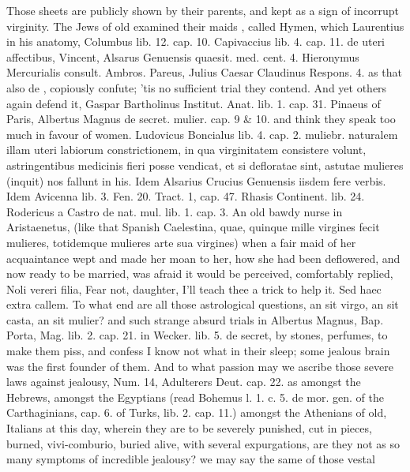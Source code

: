 Those sheets are publicly shown by their parents, and kept as a sign of
incorrupt virginity. The Jews of old examined their maids , called Hymen, which Laurentius in his anatomy, Columbus lib.
12. cap. 10. Capivaccius lib. 4. cap. 11. de uteri affectibus, Vincent,
Alsarus Genuensis quaesit. med. cent. 4. Hieronymus Mercurialis
consult. Ambros. Pareus, Julius Caesar Claudinus Respons. 4. as that
also de , copiously confute; 'tis
no sufficient trial they contend. And yet others again defend it,
Gaspar Bartholinus Institut. Anat. lib. 1. cap. 31. Pinaeus of Paris,
Albertus Magnus de secret. mulier. cap. 9 \& 10. \etc{} and think they
speak too much in favour of women.  Ludovicus Boncialus lib. 4.
cap. 2. muliebr. naturalem illam uteri labiorum constrictionem, in qua
virginitatem consistere volunt, astringentibus medicinis fieri posse
vendicat, et si defloratae sint, astutae mulieres (inquit) nos
fallunt in his. Idem Alsarius Crucius Genuensis iisdem fere verbis.
Idem Avicenna lib. 3. Fen. 20. Tract. 1, cap. 47. Rhasis
Continent. lib. 24. Rodericus a Castro de nat. mul. lib. 1. cap. 3. An
old bawdy nurse in Aristaenetus, (like that Spanish Caelestina,
quae, quinque mille virgines fecit mulieres, totidemque mulieres
arte sua virgines) when a fair maid of her acquaintance wept and made
her moan to her, how she had been deflowered, and now ready to be
married, was afraid it would be perceived, comfortably replied, Noli
vereri filia, \etc{} Fear not, daughter, I'll teach thee a trick to help
it. Sed haec extra callem. To what end are all those astrological
questions, an sit virgo, an sit casta, an sit mulier? and such strange
absurd trials in Albertus Magnus, Bap. Porta, Mag. lib. 2. cap. 21. in
Wecker. lib. 5. de secret, by stones, perfumes, to make them piss, and
confess I know not what in their sleep; some jealous brain was the
first founder of them. And to what passion may we ascribe those severe
laws against jealousy, Num.  14, Adulterers Deut. cap. 22.  
as amongst the Hebrews, amongst the Egyptians (read Bohemus l. 1.
c. 5. de mor. gen. of the Carthaginians, cap. 6. of Turks, lib. 2. cap.
11.) amongst the Athenians of old, Italians at this day, wherein they
are to be severely punished, cut in pieces, burned, vivi-comburio,
buried alive, with several expurgations, \etc{} are they not as so many
symptoms of incredible jealousy? we may say the same of those vestal
